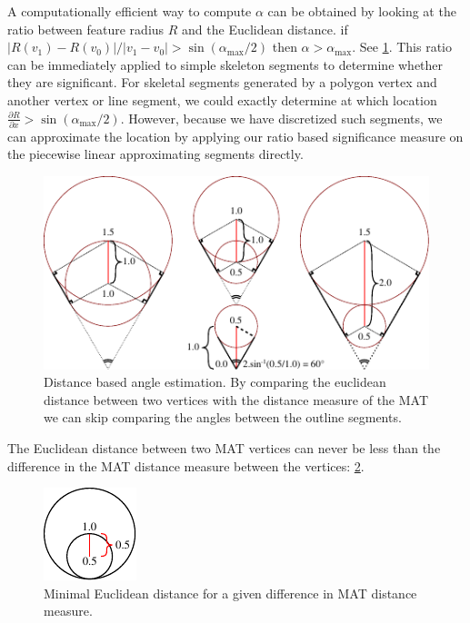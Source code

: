 A computationally efficient way to compute $\alpha$ can be obtained by looking at the ratio between feature radius $R$ and the Euclidean distance.
if $ | R(v_1) - R(v_0) | / |v_1 - v_0| >  \sin(\alpha_\text{max} / 2)$ then $\alpha > \alpha_\text{max}$.
See \cref{distance_based_angles}.
This ratio can be immediately applied to simple skeleton segments to determine whether they are significant.
For skeletal segments generated by a polygon vertex and another vertex or line segment, we could exactly determine at which location $\frac{\partial R}{\partial x} > \sin(\alpha_\text{max} / 2)$.
However, because we have discretized such segments, we can approximate the location by applying our ratio based significance measure on the piecewise linear approximating segments directly.

\begin{figure}
\centering
\includegraphics[width=.9\columnwidth]{sources/method/distance_based_angles.pdf}
\caption{Distance based angle estimation. By comparing the euclidean distance between two vertices with the distance measure of the MAT we can skip comparing the angles between the outline segments.}
\label{distance_based_angles}
\end{figure}

The Euclidean distance between two MAT vertices can never be less than the difference in the MAT distance measure between the vertices: \cref{distance_ratio_limit}.

\begin{figure}
\centering
\includegraphics[width=.3\columnwidth]{sources/method/distance_ratio_limit.pdf}
\caption{Minimal Euclidean distance for a given difference in MAT distance measure.}
\label{distance_ratio_limit}
\end{figure}

